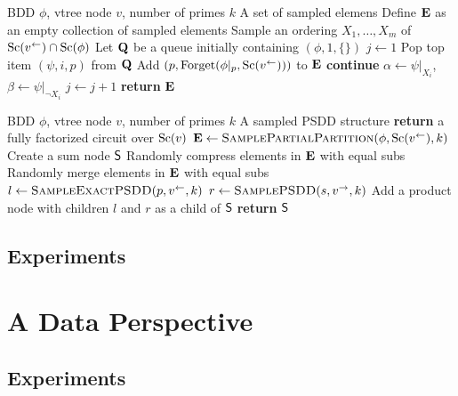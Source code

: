 \begin{algorithm}[t]
  \caption{}\label{alg:samplepartial}
  \begin{algorithmic}[1]
    \Require BDD $\phi$, vtree node $v$, number of primes $k$
    \Ensure A set of sampled elemens
    \State Define $\mathbf{E}$ as an empty collection of sampled elements
    \State Sample an ordering $X_1,\ldots,X_m$ of $\operatorname*{\normalfont{Sc}}(v^\gets)\cap\operatorname*{\normalfont{Sc}}(\phi)$
    \State Let $\mathbf{Q}$ be a queue initially containing $(\phi,1,\{\})$
    \State $j\gets 1$
      \State Pop top item $(\psi,i,p)$ from $\mathbf{Q}$
        \State Add $(p,\operatorname{\normalfont{Forget}}(\phi|_p,\operatorname*{\normalfont{Sc}}(v^\gets)))$ to $\mathbf{E}$
        \State \textbf{continue}
      \EndIf
      \State $\alpha\gets\psi|_{X_i}$, $\beta\gets\psi|_{\neg X_i}$
      \NIElse
        \State $j\gets j+1$
      \EndNIElse
    \EndWhile
    \State \textbf{return} $\mathbf{E}$
  \end{algorithmic}
\end{algorithm}

\begin{algorithm}[t]
  \caption{}\label{alg:samplepsdd}
  \begin{algorithmic}[1]
    \Require BDD $\phi$, vtree node $v$, number of primes $k$
    \Ensure A sampled PSDD structure
    \ElsIf{$\phi\equiv\top$}
      \State \textbf{return} a fully factorized circuit over $\operatorname*{\normalfont{Sc}}(v)$
    \EndIf
    \State $\set{E}\gets\Call{SamplePartialPartition}{\phi,\Sc(v^\gets),k}$
    \State Create a sum node $\operatorname{\textsf{S}}$
    \State Randomly compress elements in $\mathbf{E}$ with equal subs
    \State Randomly merge elements in $\mathbf{E}$ with equal subs
      \State $l\gets\Call{SampleExactPSDD}{p,v^\gets,k}$
      \State $r\gets\Call{SamplePSDD}{s,v^\to,k}$
      \State Add a product node with children $l$ and $r$ as a child of $\operatorname{\textsf{S}}$
    \EndFor
    \State \textbf{return} $\operatorname{\textsf{S}}$
  \end{algorithmic}
\end{algorithm}

\subsection{Experiments}

\section{A Data Perspective}
\label{sec:data}

\subsection{}

\subsection{Experiments}
